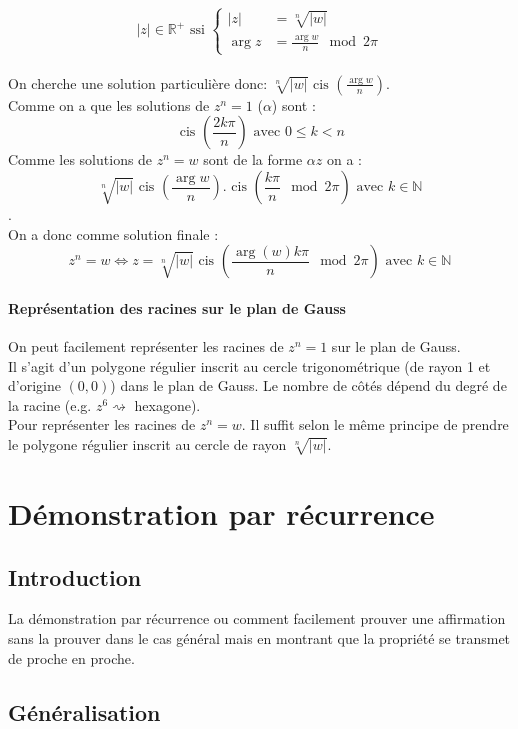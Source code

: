 \documentclass[a4paper,10pt]{report}
\newcommand{\cis}{\mbox{ cis }}
\begin{document}
$$\vert z \vert \in \mathbb{R}^{+}
\mbox { ssi } \left\{\begin{array}{ll}
 \vert z \vert & = \sqrt[n]{\vert w \vert}\\
 \arg z & = \frac{\arg w}{n} \mod 2\pi
 \end{array}\right.$$
\\
On cherche une solution particulière donc: $\sqrt[n]{\vert w \vert} \cis \left( \frac{\arg w}{n}\right)$.
\\
Comme on a que les solutions de $z^n = 1$ ($\alpha$) sont :
$$\cis \left(\frac{2k\pi}{n}\right) \mbox{ avec } 0 \leq k < n$$
Comme les solutions de $z^n=w$ sont de la forme $\alpha z$ on a :
$$\sqrt[n]{\vert w \vert}\cis \left(\frac{\arg w}{n}\right).\cis \left(\frac{k\pi}{n} \mod 2\pi\right) \mbox{ avec } k \in \mathbb{N}$$.
\\On a donc comme solution finale :
$$z^n = w \Leftrightarrow z = \sqrt[n]{\vert w \vert}\cis \left(\frac{\arg (w)k\pi}{n} \mod 2\pi \right) \mbox{ avec } k \in \mathbb{N}$$
\subsubsection{Représentation des racines sur le plan de Gauss}
On peut facilement représenter les racines de $z^n = 1$ sur le plan de Gauss.
\\Il s'agit d'un polygone régulier inscrit au cercle trigonométrique (de rayon 1 et d'origine $(0,0)$) dans le plan de Gauss. Le nombre de côtés dépend du degré de la racine (e.g. $z^6 \rightsquigarrow$ hexagone).
\\Pour représenter les racines de $z^n = w$. Il suffit selon le même principe de prendre le polygone régulier inscrit au cercle de rayon $\sqrt[n]{\vert w \vert}$.

\newpage \chapter{Démonstration par récurrence}

\section{Introduction}
La démonstration par récurrence ou comment facilement prouver une affirmation sans la prouver dans le cas général mais en montrant que la propriété se transmet de proche en proche.
\section{Généralisation}
\end{document}
